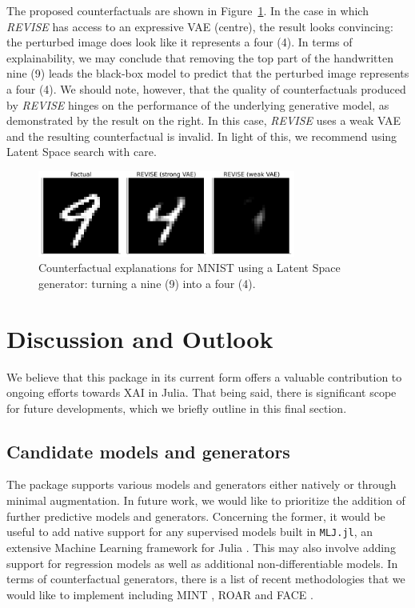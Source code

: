 \documentclass{juliacon}
\begin{document}
The proposed counterfactuals are shown in Figure~\ref{fig-mnist}. In the
case in which \emph{REVISE} has access to an expressive VAE (centre),
the result looks convincing: the perturbed image does look like it
represents a four (4). In terms of explainability, we may conclude that
removing the top part of the handwritten nine (9) leads the black-box
model to predict that the perturbed image represents a four (4). We
should note, however, that the quality of counterfactuals produced by
\emph{REVISE} hinges on the performance of the underlying generative
model, as demonstrated by the result on the right. In this case,
\emph{REVISE} uses a weak VAE and the resulting counterfactual is
invalid. In light of this, we recommend using Latent Space search with
care.

\begin{figure}

{\centering \includegraphics[width=3.33333in,height=1.11111in]{www/mnist_9to4_latent.png}

}

\caption{\label{fig-mnist}Counterfactual explanations for MNIST using a
Latent Space generator: turning a nine (9) into a four (4).}

\end{figure}

\hypertarget{sec-outlook}{%
\section{Discussion and Outlook}\label{sec-outlook}}

We believe that this package in its current form offers a valuable
contribution to ongoing efforts towards XAI in Julia. That being said,
there is significant scope for future developments, which we briefly
outline in this final section.

\hypertarget{candidate-models-and-generators}{%
\subsection{Candidate models and
generators}\label{candidate-models-and-generators}}

The package supports various models and generators either natively or
through minimal augmentation. In future work, we would like to
prioritize the addition of further predictive models and generators.
Concerning the former, it would be useful to add native support for any
supervised models built in \texttt{MLJ.jl}, an extensive Machine
Learning framework for Julia \autocite{blaom2020mlj}. This may also
involve adding support for regression models as well as additional
non-differentiable models. In terms of counterfactual generators, there
is a list of recent methodologies that we would like to implement
including MINT \autocite{karimi2021algorithmic}, ROAR
\autocite{upadhyay2021robust} and FACE \autocite{poyiadzi2020face}.
\end{document}
